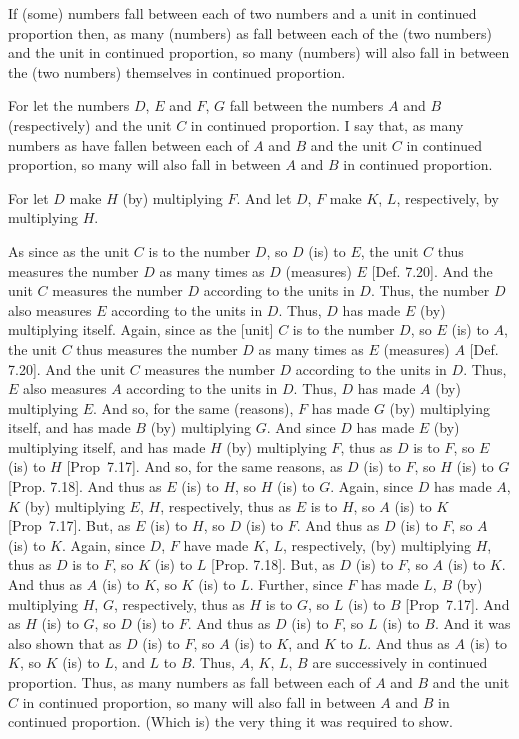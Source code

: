 \begin{Parallel}{}{}
{If (some) numbers fall between each of two numbers and a unit in continued proportion then, as many (numbers)
as fall between each of the (two numbers) and the unit in continued proportion, so many (numbers)  will also fall in between the (two numbers) themselves in continued proportion.

For let the numbers $D$, $E$ and $F$, $G$ fall between the numbers $A$ and $B$ (respectively) and the unit $C$ in continued proportion. I say that,
as many numbers as have fallen between each of $A$ and $B$ and the unit $C$ in continued proportion,
so many will also fall in between $A$ and $B$ in continued proportion.

\epsfysize=1.8in
\centerline{}

For let $D$ make $H$ (by) multiplying $F$. And let  $D$, $F$
make $K$, $L$, respectively, by multiplying $H$.

As since as the unit $C$  is to the number $D$, so $D$ (is) to $E$, the unit
$C$ thus measures the number $D$ as many times as $D$ (measures) $E$
[Def. 7.20]. And the unit $C$ measures the
number $D$ according to the units in $D$. Thus, the number $D$
also measures $E$ according to the units in $D$. Thus, $D$ has made $E$
(by) multiplying itself. Again, since as the [unit] $C$ is to
the number $D$, so $E$ (is) to $A$, the unit $C$ thus measures the number
$D$ as many times as $E$ (measures) $A$ [Def. 7.20].
  And the unit $C$ measures the number $D$ according to the units in $D$.
  Thus, $E$ also measures $A$ according to the units  in $D$. Thus, $D$
  has made $A$ (by) multiplying $E$. And so, for the same (reasons), 
  $F$ has made $G$ (by) multiplying itself, and has made $B$ (by)
  multiplying $G$. And since $D$ has made $E$ (by) multiplying itself,
  and has made $H$ (by) multiplying $F$, thus as $D$ is to $F$, so
  $E$ (is) to $H$ [Prop~7.17]. And so, for the
  same reasons, as $D$ (is) to $F$, so $H$ (is) to $G$ [Prop. 7.18].  And thus as $E$ (is) to $H$, so $H$
  (is) to $G$. Again, since $D$ has made  $A$, $K$ (by)
  multiplying $E$, $H$, respectively, thus as $E$ is to $H$, so $A$ (is)
  to $K$ [Prop~7.17]. But, as $E$ (is) to $H$,
  so $D$ (is) to $F$. And thus as $D$ (is) to $F$, so $A$ (is) to $K$.
  Again, since  $D$, $F$ have made  $K$, $L$, respectively, (by) multiplying $H$, thus as $D$ is to $F$, so $K$ (is) to $L$ [Prop. 7.18]. But, as $D$ (is) to $F$, so $A$ (is)
  to $K$.  And thus as $A$ (is) to $K$, so $K$ (is) to $L$.
   Further, since $F$ has made  $L$, $B$ (by) multiplying
   $H$, $G$, respectively, thus as $H$ is to $G$, so $L$ (is) to $B$  [Prop~7.17]. And as $H$ (is) to $G$, so $D$ (is) to $F$. And thus as $D$ 
  (is) to $F$, so $L$ (is) to $B$. And it was also
  shown that as $D$ (is) to $F$, so $A$ (is) to $K$, and $K$ to $L$.
  And thus as $A$ (is) to $K$, so $K$ (is) to $L$, and $L$ to $B$.
  Thus, $A$, $K$, $L$, $B$ are  successively in continued proportion.
  Thus, as many numbers as fall between each of $A$ and $B$ and the unit $C$ in continued proportion, so many will also fall in between $A$ and $B$
  in continued proportion. (Which is) the very thing it was required to show.}
\end{Parallel}

